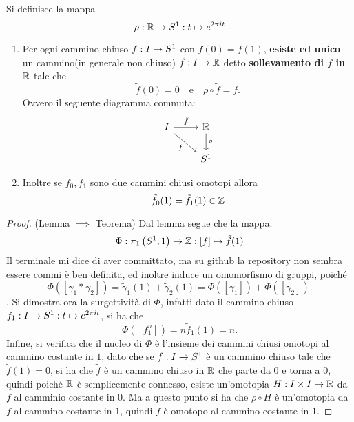 \documentclass[]{article}
\begin{document}
\begin{definition}  \nl
    Si definisce la mappa
    \[
        \rho: \mathbb{R} \to S^{1}: t \mapsto e^{2\pi i t}
    \]
\end{definition}

\begin{lemma}  \nl
    \begin{enumerate}
        \item Per ogni cammino chiuso $f: I \to S^{1}$ con $f(0) = f(1)$, 
        \textbf{esiste ed unico} un cammino(in generale non chiuso) $\tilde{f}: I \to \mathbb{R}$ detto \textbf{sollevamento di $f$ in $\mathbb{R}$} tale che
        \[
            \tilde{f}(0) = 0 \quad \text{e} \quad \rho \circ \tilde{f} = f.
        \]
        Ovvero il seguente diagramma commuta:
        \[\begin{tikzcd}
            I & \R \\
            & {\Sph{1}}
            \arrow["{\tilde{f}}", from=1-1, to=1-2]
            \arrow["f"', from=1-1, to=2-2]
            \arrow["\rho", from=1-2, to=2-2]
        \end{tikzcd}\]
        \item Inoltre se $f_0, f_1$ sono due cammini chiusi omotopi allora
        \[
            \tilde{f}_0(1) = \tilde{f}_1(1) \in \mathbb{Z}
        \] 
    \end{enumerate}
\end{lemma}

\begin{proof} (Lemma $\implies$ Teorema) \nl
    Dal lemma segue che la mappa:
    \[
        \Phi: \pi_1\left(S^{1}, 1\right) \to \mathbb{Z}: [f] \mapsto \tilde{f}(1)
    \]Il terminale mi dice di aver committato, ma su github la repository non sembra essere commi
    \`e ben definita, ed inoltre induce un omomorfismo di gruppi, poich\'e
    \[
        \Phi\left([\gamma_1 * \gamma_2]\right) = \tilde{\gamma}_1(1) + \tilde{\gamma}_2(1) = \Phi\left([\gamma_1]\right) + \Phi\left([\gamma_2]\right).
    \].
    Si dimostra ora la surgettivit\`a di $\Phi$, infatti dato il cammino chiuso $f_1: I \to S^{1}: t \mapsto e^{2\pi i t}$, si ha che
    \[
        \Phi\left([f_1^n]\right) = n \tilde{f}_1(1) = n.
    \]
    Infine, si verifica che il nucleo di $\Phi$ \`e l'insieme dei cammini chiusi omotopi al cammino costante in $1$, dato che
    se $f: I \to S^{1}$ \`e un cammino chiuso tale che $\tilde{f}(1) = 0$, si ha che $\tilde{f}$ \`e un cammino chiuso in $\mathbb{R}$ che parte da $0$ e torna a $0$, quindi
    poich\'e $\mathbb{R}$ \`e semplicemente connesso, esiste un'omotopia $H: I \times I \to \mathbb{R}$ da $\tilde{f}$ al camminio costante in $0$.
    Ma a questo punto si ha che $\rho \circ H$ è un'omotopia da $f$ al cammino costante in $1$, quindi $f$ è omotopo al cammino costante in $1$.
\end{proof}
\end{document}
